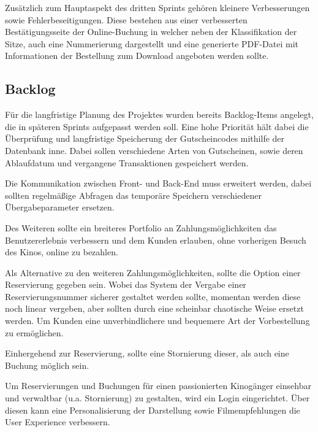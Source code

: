 Zusätzlich zum Hauptaspekt des dritten Sprints gehören kleinere Verbesserungen sowie Fehlerbeseitigungen. 
Diese bestehen aus einer verbesserten Bestätigungsseite der Online-Buchung in welcher neben der Klassifikation der Sitze, auch eine Nummerierung dargestellt und eine generierte PDF-Datei mit Informationen der Bestellung zum Download angeboten werden sollte.

\subsection{Backlog}
Für die langfristige Planung des Projektes wurden bereits Backlog-Items angelegt, die in späteren Sprints aufgepasst werden soll.
Eine hohe Priorität hält dabei die Überprüfung und langfristige Speicherung der Gutscheincodes mithilfe der Datenbank inne.
Dabei sollen verschiedene Arten von Gutscheinen, sowie deren Ablaufdatum und vergangene Transaktionen gespeichert werden. 

Die Kommunikation zwischen Front- und Back-End muss erweitert werden, dabei sollten regelmäßige Abfragen das temporäre Speichern verschiedener Übergabeparameter ersetzen.

Des Weiteren sollte ein breiteres Portfolio an Zahlungsmöglichkeiten das Benutzererlebnis verbessern und dem Kunden erlauben, ohne vorherigen Besuch des Kinos, online zu bezahlen.

Als Alternative zu den weiteren Zahlungsmöglichkeiten, sollte die Option einer Reservierung gegeben sein.
Wobei das System der Vergabe einer Reservierungsnummer sicherer gestaltet werden sollte, momentan werden diese noch linear vergeben, aber sollten durch eine scheinbar chaotische Weise ersetzt werden.
Um Kunden eine unverbindlichere und bequemere Art der Vorbestellung zu ermöglichen.

Einhergehend zur Reservierung, sollte eine Stornierung dieser, als auch eine Buchung möglich sein.

Um Reservierungen und Buchungen für einen passionierten Kinogänger einsehbar und verwaltbar (u.a. Stornierung) zu gestalten, wird ein Login eingerichtet. 
Über diesen kann eine Personalisierung der Darstellung sowie Filmempfehlungen die User Experience verbessern.


